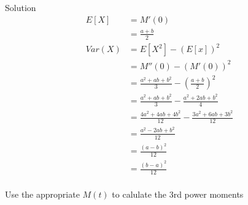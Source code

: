 \documentclass{article}
\begin{document}
\begin{spacing}{1.1}
\begin{homeworkProblem}
\begin{homeworkSection}{Solution}
\begin{align*}
      E[X] &= M'(0)\\
      &= \frac{ a + b}{ 2}\\
      Var(X) &= E[ X^2] - (E[x])^2\\
      &= M''(0) - (M'(0))^2\\
      &= \frac{ a^2 + ab + b^2}{ 3} - (\frac{ a + b}{ 2})^2\\
      &= \frac{ a^2 + ab + b^2}{ 3} - \frac{ a^2 + 2ab + b^2}{ 4}\\
      &= \frac{ 4a^2 + 4ab + 4b^2}{ 12} - \frac{ 3a^2 + 6ab + 3b^2}{ 12}\\
      &= \frac{ a^2 - 2ab + b^2}{ 12}\\
      &= \frac{ (a - b)^2}{ 12}\\
      &= \frac{ (b - a)^2}{ 12}\\
    \end{align*}
  \end{homeworkSection}
\end{homeworkProblem}

\newpage
\begin{homeworkProblem}
  Use the appropriate $M( t)$ to calulate the 3rd power moments


\end{homeworkProblem}
\end{spacing}
\end{document}
